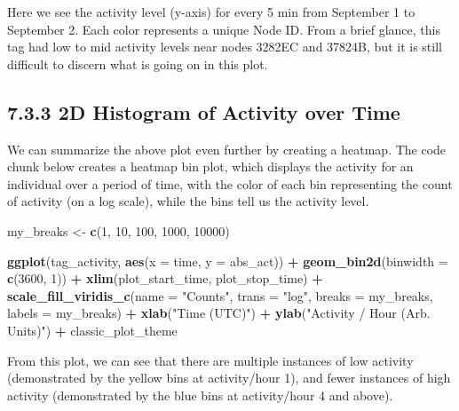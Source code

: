 \documentclass[
]{book}
\newenvironment{Shaded}{\begin{snugshade}}{\end{snugshade}}
\newcommand{\AttributeTok}[1]{\textcolor[rgb]{0.13,0.29,0.53}{#1}}
\newcommand{\DecValTok}[1]{\textcolor[rgb]{0.00,0.00,0.81}{#1}}
\newcommand{\FunctionTok}[1]{\textcolor[rgb]{0.13,0.29,0.53}{\textbf{#1}}}
\newcommand{\NormalTok}[1]{#1}
\newcommand{\OtherTok}[1]{\textcolor[rgb]{0.56,0.35,0.01}{#1}}
\newcommand{\SpecialCharTok}[1]{\textcolor[rgb]{0.81,0.36,0.00}{\textbf{#1}}}
\newcommand{\StringTok}[1]{\textcolor[rgb]{0.31,0.60,0.02}{#1}}
\begin{document}
Here we see the activity level (y-axis) for every 5 min from September 1 to September 2. Each color represents a unique Node ID. From a brief glance, this tag had low to mid activity levels near nodes 3282EC and 37824B, but it is still difficult to discern what is going on in this plot.

\subsection{7.3.3 2D Histogram of Activity over Time}\label{d-histogram-of-activity-over-time}

We can summarize the above plot even further by creating a heatmap. The code chunk below creates a heatmap bin plot, which displays the activity for an individual over a period of time, with the color of each bin representing the count of activity (on a log scale), while the bins tell us the activity level.

\begin{Shaded}
\begin{Highlighting}[]
\NormalTok{my\_breaks }\OtherTok{\textless{}{-}} \FunctionTok{c}\NormalTok{(}\DecValTok{1}\NormalTok{, }\DecValTok{10}\NormalTok{, }\DecValTok{100}\NormalTok{, }\DecValTok{1000}\NormalTok{, }\DecValTok{10000}\NormalTok{)}

\FunctionTok{ggplot}\NormalTok{(tag\_activity, }
       \FunctionTok{aes}\NormalTok{(}\AttributeTok{x =}\NormalTok{ time, }
           \AttributeTok{y =}\NormalTok{ abs\_act)) }\SpecialCharTok{+}
  \FunctionTok{geom\_bin2d}\NormalTok{(}\AttributeTok{binwidth =} \FunctionTok{c}\NormalTok{(}\DecValTok{3600}\NormalTok{, }\DecValTok{1}\NormalTok{)) }\SpecialCharTok{+}
  \FunctionTok{xlim}\NormalTok{(plot\_start\_time, }
\NormalTok{       plot\_stop\_time) }\SpecialCharTok{+}
  \FunctionTok{scale\_fill\_viridis\_c}\NormalTok{(}\AttributeTok{name =} \StringTok{"Counts"}\NormalTok{, }
                       \AttributeTok{trans =} \StringTok{"log"}\NormalTok{, }
                       \AttributeTok{breaks =}\NormalTok{ my\_breaks, }
                       \AttributeTok{labels =}\NormalTok{ my\_breaks) }\SpecialCharTok{+}
  \FunctionTok{xlab}\NormalTok{(}\StringTok{"Time (UTC)"}\NormalTok{) }\SpecialCharTok{+}
  \FunctionTok{ylab}\NormalTok{(}\StringTok{"Activity / Hour (Arb. Units)"}\NormalTok{) }\SpecialCharTok{+}  
\NormalTok{  classic\_plot\_theme}
\end{Highlighting}
\end{Shaded}

From this plot, we can see that there are multiple instances of low activity (demonstrated by the yellow bins at activity/hour 1), and fewer instances of high activity (demonstrated by the blue bins at activity/hour 4 and above).
\end{document}
